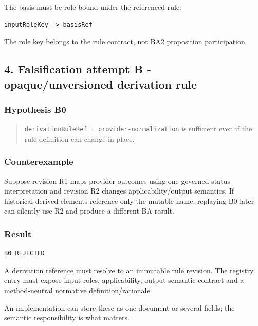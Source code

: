 \documentclass[11pt,a4paper]{article}
\begin{document}
The basis must be role-bound under the referenced rule:

\begin{verbatim}
inputRoleKey -> basisRef
\end{verbatim}

The role key belongs to the rule contract, not BA2 proposition
participation.

\subsection{4. Falsification attempt B - opaque/unversioned derivation
rule}\label{falsification-attempt-b---opaqueunversioned-derivation-rule}

\subsubsection{Hypothesis B0}\label{hypothesis-b0}

\begin{quote}
\texttt{derivationRuleRef\ =\ provider-normalization} is sufficient even
if the rule definition can change in place.
\end{quote}

\subsubsection{Counterexample}\label{counterexample}

Suppose revision R1 maps provider outcomes using one governed status
interpretation and revision R2 changes applicability/output semantics.
If historical derived elements reference only the mutable name,
replaying B0 later can silently use R2 and produce a different BA
result.

\subsubsection{Result}\label{result-1}

\begin{verbatim}
B0 REJECTED
\end{verbatim}

A derivation reference must resolve to an immutable rule revision. The
registry entry must expose input roles, applicability, output semantic
contract and a method-neutral normative definition/rationale.

An implementation can store these as one document or several fields; the
semantic responsibility is what matters.
\end{document}
